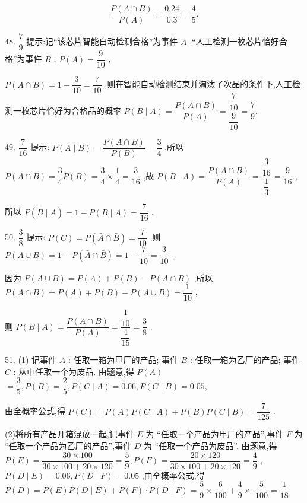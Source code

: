 \[
\dfrac{P\left( {A \cap  B}\right) }{P\left( A\right) } = \dfrac{0.24}{0.3} = \dfrac{4}{5}.
\]

48. $\dfrac{7}{9}$ 提示:记“该芯片智能自动检测合格”为事件 $A$ ,“人工检测一枚芯片恰好合格”为事件 $B$ , $P\left( A\right)  = \dfrac{9}{10}$ ,

$P\left( {A \cap  B}\right)  = 1 - \dfrac{3}{10} = \dfrac{7}{10}$ ,则在智能自动检测结束并淘汰了次品的条件下,人工检测一枚芯片恰好为合格品的概率 $P\left( {B \mid  A}\right)  = \dfrac{P\left( {A \cap  B}\right) }{P\left( A\right) } = \dfrac{\dfrac{7}{10}}{\dfrac{9}{10}} = \dfrac{7}{9}.$

49. $\dfrac{7}{16}$ 提示: $P\left( {A \mid  B}\right)  = \dfrac{P\left( {A \cap  B}\right) }{P\left( B\right) } = \dfrac{3}{4}$ ,所以 $P\left( {A \cap  B}\right)  = \dfrac{3}{4}P\left( B\right)  = \dfrac{3}{4} \times  \dfrac{1}{4} = \dfrac{3}{16}$ ,故 $P\left( {B \mid  A}\right)  = \dfrac{P\left( {A \cap  B}\right) }{P\left( A\right) } = \dfrac{\dfrac{3}{16}}{\dfrac{1}{3}} = \dfrac{9}{16}$ ,

所以 $P\left( {\bar{B} \mid  A}\right)  = 1 - P\left( {B \mid  A}\right)  = \dfrac{7}{16}$ .

50. $\dfrac{3}{8}$ 提示: $P\left( C\right)  = P\left( {\bar{A} \cap  \bar{B}}\right)  = \dfrac{7}{10}$ ,则 $P\left( {A \cup  B}\right)  = 1 - P\left( {\bar{A} \cap  \bar{B}}\right)  = 1 - \dfrac{7}{10} = \dfrac{3}{10}$ .

因为 $P\left( {A \cup  B}\right)  = P\left( A\right)  + P\left( B\right)  - P\left( {A \cap  B}\right)$ ,所以 $P\left( {A \cap  B}\right)  = P\left( A\right)  + P\left( B\right)  - P\left( {A \cup  B}\right)  = \dfrac{1}{10}$ ,

则 $P\left( {B \mid  A}\right)  = \dfrac{P\left( {A \cap  B}\right) }{P\left( A\right) } = \dfrac{\dfrac{1}{10}}{\dfrac{4}{15}} = \dfrac{3}{8}$ .

51. (1) 记事件 $A$ : 任取一箱为甲厂的产品; 事件 $B$ : 任取一箱为乙厂的产品; 事件 $C$ : 从中任取一个为废品. 由题意,得 $P\left( A\right)$  $= \dfrac{3}{5},P\left( B\right)  = \dfrac{2}{5},P\left( {C \mid  A}\right)  = {0.06},P\left( {C \mid  B}\right)  = {0.05},$

由全概率公式,得 $P\left( C\right)  = P\left( A\right) P\left( {C \mid  A}\right)  + P\left( B\right) P\left( {C \mid  B}\right)  = \dfrac{7}{125}$ .

(2)将所有产品开箱混放一起,记事件 $E$ 为 “任取一个产品为甲厂的产品”,事件 $F$ 为 “任取一个产品为乙厂的产品”,事件 $D$ 为 “任取一个产品为废品”. 由题意,得 $P\left( E\right)  = \dfrac{{30} \times  {100}}{{30} \times  {100} + {20} \times  {120}} = \dfrac{5}{9},P\left( F\right)  = \dfrac{{20} \times  {120}}{{30} \times  {100} + {20} \times  {120}} = \dfrac{4}{9}$ , $P\left( {D \mid  E}\right)  = {0.06},P\left( {D \mid  F}\right)  = {0.05}$ ,由全概率公式,得 $P\left( D\right)  = P\left( E\right) P\left( {D \mid  E}\right)  + P\left( F\right)  \cdot  P\left( {D \mid  F}\right)  = \dfrac{5}{9} \times  \dfrac{6}{100} + \dfrac{4}{9} \times$  $\dfrac{5}{100} = \dfrac{1}{18}$

